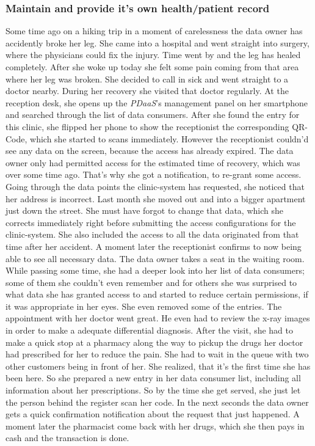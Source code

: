 \documentclass[12pt,english,a4paper,titlepage,cleardoublepage=empty,dottedtoc]{report}
\begin{document}
\subsubsection{Maintain and provide it's own health/patient
record}\label{maintain-and-provide-its-own-healthpatient-record}

Some time ago on a hiking trip in a moment of carelessness the data
owner has accidently broke her leg. She came into a hospital and went
straight into surgery, where the physicians could fix the injury. Time
went by and the leg has healed completely. After she woke up today she
felt some pain coming from that area where her leg was broken. She
decided to call in sick and went straight to a doctor nearby. During her
recovery she visited that doctor regularly. At the reception desk, she
opens up the \emph{PDaaS}'s management panel on her smartphone and
searched through the list of data consumers. After she found the entry
for this clinic, she flipped her phone to show the receptionist the
corresponding QR-Code, which she started to scans immediately. However
the receptionist couldn'd see any data on the screen, because the access
has already expired. The data owner only had permitted access for the
estimated time of recovery, which was over some time ago. That's why she
got a notification, to re-grant some access. Going through the data
points the clinic-system has requested, she noticed that her address is
incorrect. Last month she moved out and into a bigger apartment just
down the street. She must have forgot to change that data, which she
corrects immediately right before submitting the access configurations
for the clinic-system. She also included the access to all the data
originated from that time after her accident. A moment later the
receptionist confirms to now being able to see all necessary data. The
data owner takes a seat in the waiting room. While passing some time,
she had a deeper look into her list of data consumers; some of them she
couldn't even remember and for others she was surprised to what data she
has granted access to and started to reduce certain permissions, if it
was appropriate in her eyes. She even removed some of the entries. The
appointment with her doctor went great. He even had to review the x-ray
images in order to make a adequate differential diagnosis. After the
visit, she had to make a quick stop at a pharmacy along the way to
pickup the drugs her doctor had prescribed for her to reduce the pain.
She had to wait in the queue with two other customers being in front of
her. She realized, that it's the first time she has been here. So she
prepared a new entry in her data consumer list, including all
information about her prescriptions. So by the time she get served, she
just let the person behind the register scan her code. In the next
seconds the data owner gets a quick confirmation notification about the
request that just happened. A moment later the pharmacist come back with
her drugs, which she then pays in cash and the transaction is done.
\end{document}
